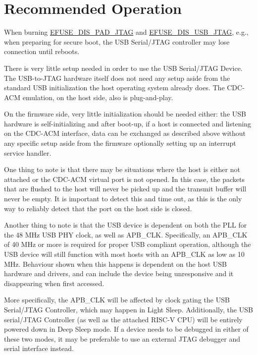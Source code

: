 \documentclass[main\_\_EN.tex]{subfiles}
\begin{document}
\section{Recommended Operation}
\label{sec:usbserialjtag-recommended-operation}

\vspace{1em}
\begin{tiplisting}
When burning \hyperref[fielddesc:EFUSEDISPADJTAG]{EFUSE\_DIS\_PAD\_JTAG} and \hyperref[fielddesc:EFUSEDISUSBJTAG]{EFUSE\_DIS\_USB\_JTAG}, e.g., when preparing for secure boot, the USB Serial/JTAG controller may lose connection until \chipname{} reboots. 
\end{tiplisting}

There is very little setup needed in order to use the USB Serial/JTAG Device. The USB-to-JTAG hardware itself does not need any setup aside from the standard USB initialization the host operating system already does. The CDC-ACM emulation, on the host side, also is plug-and-play.

On the firmware side, very little initialization should be needed either: the USB hardware is self-initializing and after boot-up, if a host is connected and listening on the CDC-ACM interface, data can be exchanged as described above without any specific setup aside from the firmware optionally setting up an interrupt service handler.

One thing to note is that there may be situations where the host is either not attached or the CDC-ACM virtual port is not opened. In this case, the packets that are flushed to the host will never be picked  up and the transmit buffer will never be empty. It is important to detect this and time out, as this is the only way to reliably detect that the port on the host side is closed.

Another thing to note is that the USB device is dependent on both the PLL for the 48 MHz USB PHY clock, as well as APB\_CLK. Specifically, an APB\_CLK of 40 MHz or more is required for proper USB compliant operation, although the USB device will still function with most hosts with an APB\_CLK as low as 10 MHz. Behaviour shown when this happens is dependent on the host USB hardware and drivers, and can include the device being unresponsive and it disappearing when first accessed.

More specifically, the APB\_CLK will be affected by clock gating the USB Serial/JTAG Controller, which may happen in Light Sleep. Additionally, the USB serial/JTAG Controller (as well as the attached RISC-V CPU) will be entirely powered down in Deep Sleep mode. If a device needs to be debugged in either of these two modes, it may be preferable to use an external JTAG debugger and serial interface instead.
\end{document}
